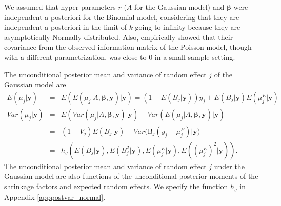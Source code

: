 \documentclass[article]{jss}
\begin{document}
We assumed that hyper-parameters $r$ ($A$ for the Gaussian model) and  $\boldsymbol{\beta}$ were independent a posteriori for the Binomial model, considering that they are independent a posteriori in the limit of $k$ going to infinity  because they are asymptotically Normally distributed. Also, \cite{morris1997}  empirically showed that their covariance from the observed information matrix of the Poisson model, though with a different parametrization, was close to 0 in a small sample setting. 


The unconditional posterior mean and variance of random effect $j$ of the Gaussian model are
\begin{eqnarray}
E(\mu_j\vert \boldsymbol{y}) &=&E(E(\mu_{j}\vert A, \boldsymbol{\beta}, \boldsymbol{y})\vert\boldsymbol{y})=(1-E(B_j\vert\boldsymbol{y}))y_j + E(B_j\vert  \boldsymbol{y})E(\mu^E_j\vert  \boldsymbol{y})\label{postmean_normal} \\
Var(\mu_{j}\vert \boldsymbol{y}) &=&  E(Var(\mu_{j}\vert A,  \boldsymbol{\beta}, \boldsymbol{y})\vert \boldsymbol{y})+Var(E(\mu_{j}\vert A, \boldsymbol{\beta}, \boldsymbol{y})\vert \boldsymbol{y})\label{postvar_normal}\\
&=&  (1-V_j)E(B_j\vert  \boldsymbol{y})+Var\big(\textrm{B}_{j}(y_{j}-\mu^E_{j})\vert \boldsymbol{y}\big) \\
&=&h_g(E(B_j\vert\boldsymbol{y}), E(B^2_j\vert\boldsymbol{y}),  E(\mu^E_j\vert\boldsymbol{y}), E((\mu^E_j)^2\vert\boldsymbol{y})).\label{approximate_var_normal}
\end{eqnarray}
The unconditional posterior mean and variance of random effect $j$ under the Gaussian model are also functions of the unconditional posterior moments of the shrinkage factors and expected random effects. We specify the function $h_g$ in Appendix \ref{apppostvar_normal}.
\end{document}
